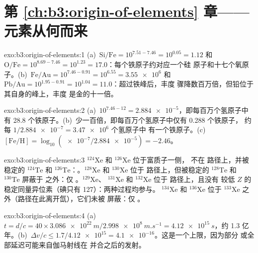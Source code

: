 \section*{第 \ref{ch:b3:origin-of-elements} 章——元素从何而来}

\begin{solution}{exo:b3:origin-of-elements:1}
(a)~$\mathrm{Si/Fe} = 10^{7.51 - 7.46} = 10^{0.05} = 1.12$ 和
$\mathrm{O/Fe} = 10^{8.69 - 7.46} = 10^{1.23} = 17.0$：每个铁原子约对应一个硅
原子和十七个氧原子。(b)~$\mathrm{Fe/Au} =
10^{7.46 - 0.91} = 10^{6.55} = \num{3.55e6}$ 和 $\mathrm{Pb/Au} =
10^{1.95 - 0.91} = 10^{1.04} = 11.0$：超过铁峰后，丰度
骤降数百万倍，但铅位于其自身的峰上，丰度
是金的十一倍。
\end{solution}

\begin{solution}{exo:b3:origin-of-elements:2}
(a)~$10^{7.46 - 12} = \num{2.884e-5}$，即每百万个氢原子中
有 \num{28.8} 个铁原子。(b)~少一百倍，即每百万个氢原子中仅有 \num{0.288} 个铁原子，
约每 $1/\num{2.884e-7} = \num{3.47e6}$ 个氢原子中
有一个铁原子。(c)~$[\mathrm{Fe/H}] = \log_{10}(\num{e-7}/\num{2.884e-5}) =
-2.46$。
\end{solution}

\begin{solution}{exo:b3:origin-of-elements:3}
$^{124}\mathrm{Xe}$ 和 $^{126}\mathrm{Xe}$ 位于富质子一侧，
不在 路径上，并被稳定的 $^{124}\mathrm{Te}$ 和
$^{126}\mathrm{Te}$：。$^{128}\mathrm{Xe}$ 和 $^{130}\mathrm{Xe}$
位于 路径上，但被稳定的
$^{128}\mathrm{Te}$ 和 $^{130}\mathrm{Te}$ 屏蔽于 之外：仅 。$^{129}\mathrm{Xe}$、
$^{131}\mathrm{Xe}$ 和 $^{132}\mathrm{Xe}$ 位于 路径上，且没有
较低 $Z$ 的稳定同量异位素（碘只有 127）：两种过程均参与。
$^{134}\mathrm{Xe}$ 和 $^{136}\mathrm{Xe}$ 位于
$^{133}\mathrm{Xe}$ 之外（路径在此离开氙），它们未被
屏蔽：仅 。
\end{solution}

\begin{solution}{exo:b3:origin-of-elements:4}
(a)~$t = d/c = 40\times\qty{3.086e22}{m}/\qty{2.998e8}{m.s^{-1}} =
\qty{4.12e15}{s}$，约 1.3 亿年。(b)~$\Delta v/c \le
1.7/\num{4.12e15} = \num{4.1e-16}$。这是一个上限，因为部分
或全部延迟可能来自伽马射线在
并合之后的发射。
\end{solution}


